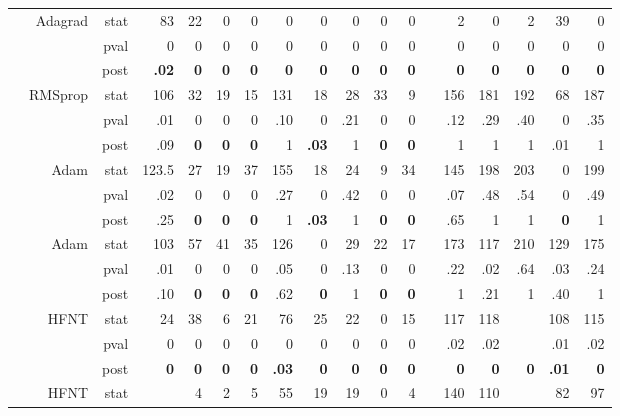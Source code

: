\documentclass[11pt,a4paper]{article}
\begin{document}
\begin{table}
\begin{tabular}[t]{lrrrrrrrrrrrrrrrrr}
& Adagrad & stat & 83 & 22 & 0 & 0 & 0 & 0 & 0 & 0 & 0 &  & 2 & 0 & 2 & 39 & 0 \\
            &  & pval & 0 & 0 & 0 & 0 & 0 & 0 & 0 & 0 & 0 &  & 0 & 0 & 0 & 0 & 0 \\
            &  & post & \textbf{.02} & \textbf{0} & \textbf{0} & \textbf{0} & \textbf{0} & \textbf{0} & \textbf{0} & \textbf{0} & \textbf{0} &  & \textbf{0} & \textbf{0} & \textbf{0} & \textbf{0} & \textbf{0} \\
& RMSprop & stat & 106 & 32 & 19 & 15 & 131 & 18 & 28 & 33 & 9 &  & 156 & 181 & 192 & 68 & 187 \\
            &  & pval & .01 & 0 & 0 & 0 & .10 & 0 & .21 & 0 & 0 &  & .12 & .29 & .40 & 0 & .35 \\
            &  & post & .09 & \textbf{0} & \textbf{0} & \textbf{0} & 1 & \textbf{.03} & 1 & \textbf{0} & \textbf{0} &  & 1 & 1 & 1 & .01 & 1 \\
& Adam & stat & 123.5 & 27 & 19 & 37 & 155 & 18 & 24 & 9 & 34 &  & 145 & 198 & 203 & 0 & 199 \\
            &  & pval & .02 & 0 & 0 & 0 & .27 & 0 & .42 & 0 & 0 &  & .07 & .48 & .54 & 0 & .49 \\
            &  & post & .25 & \textbf{0} & \textbf{0} & \textbf{0} & 1 & \textbf{.03} & 1 & \textbf{0} & \textbf{0} &  & .65 & 1 & 1 & \textbf{0} & 1 \\
&Adam & stat & 103 & 57 & 41 & 35 & 126 & 0 & 29 & 22 & 17 &  & 173 & 117 & 210 & 129 & 175  \\ 
            & & pval & .01 & 0 & 0 & 0 & .05 & 0 & .13 & 0 & 0 &  & .22 & .02 & .64 & .03 & .24  \\ 
            & & post & .10 & \textbf{0} & \textbf{0} & \textbf{0} & .62 & \textbf{0} & 1 & \textbf{0} & \textbf{0} &  & 1 & .21 & 1 & .40 & 1  \\ 
            \cmidrule{1-2}
            \parbox[t]{3mm}{}
& HFNT & stat & 24 & 38 & 6 & 21 & 76 & 25 & 22 & 0 & 15 &  & 117 & 118 &  & 108 & 115 \\
            & & pval & 0 & 0 & 0 & 0 & 0 & 0 & 0 & 0 & 0 &  & .02 & .02 &  & .01 & .02 \\
            & & post & \textbf{0} & \textbf{0} & \textbf{0} & \textbf{0} & \textbf{.03} & \textbf{0} & \textbf{0} & \textbf{0} & \textbf{0} &  & \textbf{0} & \textbf{0} & \textbf{0} & \textbf{.01} & \textbf{0} \\
& HFNT & stat &  & 4 & 2 & 5 & 55 & 19 & 19 & 0 & 4 &  & 140 & 110 &  & 82 & 97 \\

\end{tabular}
\end{table}
\end{document}
